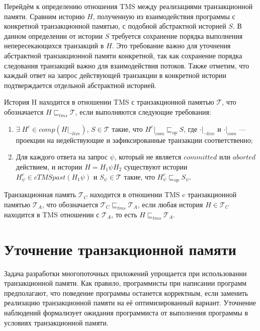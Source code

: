 Перейдём к определению отношения TMS между реализациями транзакционной памяти. Сравним историю $H$, полученную из взаимодействия программы с конкретной транзакционной памятью, с подобной абстрактной историей $S$. В данном определении от истории $S$ требуется сохранение порядка выполнения непересекающихся транзакций в $H$. Это требование важно для уточнения абстрактной транзакционной памяти конкретной, так как сохранение порядка следования транзакций важно для взаимодействия потоков. Также отметим, что каждый ответ на запрос действующей транзакции в конкретной истории подтверждается отдельной абстрактной историей.
\begin{mydefinition}\label{tms}
История H находится в отношении TMS с транзакционной памятью $\mathcal{T}$, что обозначается $H \sqsubseteq_{tms} \mathcal{T}$, если выполняются следующие требования:
\begin{enumerate}[label = (\roman*)]
\item $\exists \; H^c \in comp(H|_{\neg live})$, $S \in \mathcal{T}$ такие, что $H^c|_{com} \sqsubseteq_{op} S$, где $\cdot|_{\neg live}$ и $\cdot|_{com}$ --- проекции на недействующие и зафиксированные транзакции соответственно;
\item Для каждого ответа на запрос $\psi$, который не является $committed$ или $aborted$ действием, и истории $H = H_1\psi{H_2}$ существуют истории $H^c_{\psi} \in cTMSpast(H_1\psi)$ и $S_{\psi} \in \mathcal{T}$ такие, что $H^c_{\psi} \sqsubseteq_{op} S_{\psi}$. 
\end{enumerate}
Транзакционная память $\mathcal{T}_C$ находится в отношении TMS c транзакционной памятью $\mathcal{T}_A$, что обозначается $\mathcal{T}_C \sqsubseteq_{tms} \mathcal{T}_A$, если любая история $H \in \mathcal{T}_C$ находится в TMS отношении с $\mathcal{T}_A$, то есть $H \sqsubseteq_{tms} \mathcal{T}_{A}$.
\end{mydefinition}

\section{Уточнение транзакционной памяти}
Задача разработки многопоточных приложений упрощается при использовании транзакционной памяти. Как правило, программисты при написании программ предполагают, что поведение программы останется корректным, если заменить реализацию транзакционной памяти на её оптимизированный вариант. Уточнение наблюдений формализует ожидания программиста от выполнения программы в условиях транзакционной памяти.

